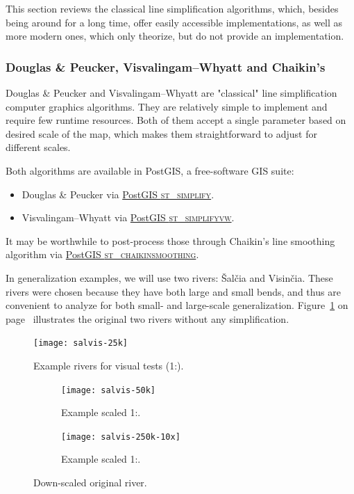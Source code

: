 \documentclass[a4paper]{article}
\newcommand{\onpage}[1]{\ref{#1} on page~\pageref{#1}}
\newcommand{\DP}{Douglas \& Peucker}
\newcommand{\VW}{Visvalingam--Whyatt}
\begin{document}
This section reviews the classical line simplification algorithms, which,
besides being around for a long time, offer easily accessible implementations,
as well as more modern ones, which only theorize, but do not provide an
implementation.

\subsubsection{{\DP}, {\VW} and Chaikin's}
\label{sec:dp-vw-chaikin}

{\DP}\cite{douglas1973algorithms} and {\VW}\cite{visvalingam1993line} are
"classical" line simplification computer graphics algorithms. They are
relatively simple to implement and require few runtime resources. Both of them
accept a single parameter based on desired scale of the map, which makes them
straightforward to adjust for different scales.

Both algorithms are available in PostGIS, a free-software GIS suite:
\begin{itemize}
    \item {\DP} via
        \href{https://postgis.net/docs/ST_Simplify.html}{PostGIS \textsc{st\_simplify}}.

    \item {\VW} via
        \href{https://postgis.net/docs/ST_SimplifyVW.html}{PostGIS
        \textsc{st\_simplifyvw}}.
\end{itemize}

It may be worthwhile to post-process those through Chaikin's line smoothing
algorithm\cite{chaikin1974algorithm} via
\href{https://postgis.net/docs/ST_ChaikinSmoothing.html}{PostGIS
\textsc{st\_chaikinsmoothing}}.

In generalization examples, we will use two rivers: Šalčia and Visinčia.
These rivers were chosen because they have both large and small bends, and
thus are convenient to analyze for both small- and large-scale generalization.
Figure~\onpage{fig:salvis-25} illustrates the original two rivers without any
simplification.

\begin{figure}[ht]
    \centering
    \texttt{[image: salvis-25k]}
    \caption{Example rivers for visual tests (1:{}).}
    \label{fig:salvis-25}
\end{figure}

\begin{figure}[ht]
    \centering
    \begin{subfigure}[b]{.49\textwidth}
        \texttt{[image: salvis-50k]}
        \caption{Example scaled 1:.}
        \label{fig:salvis-50k}
    \end{subfigure}
    \hfill
    \begin{subfigure}[b]{.49\textwidth}
        \centering
        \texttt{[image: salvis-250k-10x]}
        \caption{Example scaled 1:.}
    \end{subfigure}
    \caption{Down-scaled original river.}
    \label{fig:salvis-50-250}
\end{figure}
\end{document}
